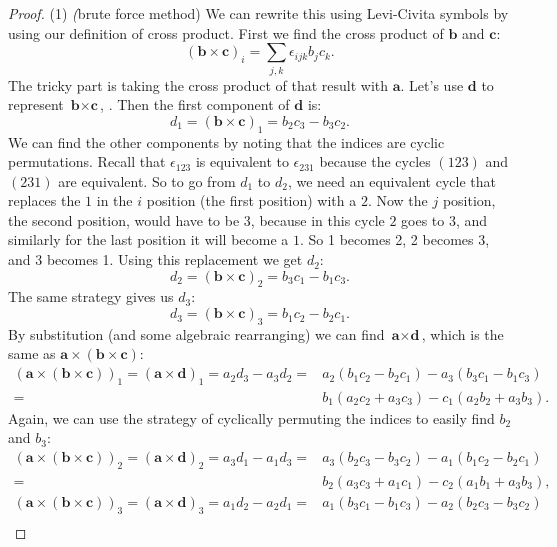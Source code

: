 \begin{proof}(1) \emph(brute force method)
We can rewrite this using Levi-Civita symbols by using our definition of cross product.  First we find the cross product of $\textbf{b}$ and $\textbf{c}$:
\[ (\textbf{b} \times \textbf{c})_i = \sum_{j,k} \epsilon_{ijk} b_j c_k. \]
The tricky part is taking the cross product of that result with $\textbf{a}$.  Let's use $\textbf{d}$ to represent $\textbf{b} \times \textbf{c}$, .  Then the first component of $\textbf{d}$ is:
\[d_1 = \left(\textbf{b} \times \textbf{c} \right)_1 = b_2 c_3 - b_3 c_2. \]
We can find the other components by noting that the indices are cyclic permutations.  Recall that $\epsilon_{123}$ is equivalent to $\epsilon_{231}$ because the cycles $(123)$ and $(231)$ are equivalent.  So to go from $d_1$ to $d_2$, we need an equivalent cycle that replaces the $1$ in the $i$ position (the first position) with a $2$.  Now the $j$ position, the second position, would have to be $3$, because in this cycle $2$ goes to $3$, and similarly for the last position it will become a $1$.  So 1 becomes 2, 2 becomes 3, and 3 becomes 1.  Using this replacement we get $d_2$:
\[d_2 = \left(\textbf{b} \times \textbf{c} \right)_2 = b_3 c_1 - b_1 c_3. \]
The same strategy gives us $d_3$:
\[d_3 = \left(\textbf{b} \times \textbf{c} \right)_3 = b_1 c_2 - b_2 c_1. \]
By substitution (and some algebraic rearranging) we can find $\textbf{a} \times \textbf{d}$, which is the same as $\textbf{a} \times \left(\textbf{b} \times \textbf{c}\right)$:
\begin{align*}
 \left(\textbf{a} \times (\textbf{b} \times \textbf{c}) \right)_1 =  \left(\textbf{a} \times \textbf{d} \right)_1 =  a_2 d_3 - a_3 d_2 =& a_2 \left(b_1 c_2 - b_2 c_1 \right) - a_3 \left(b_3 c_1 - b_1 c_3 \right) \\
=& b_1 \left(a_2 c_2 + a_3 c_3\right) - c_1 \left(a_2 b_2 + a_3 b_3 \right). 
\end{align*}
Again, we can use the strategy of cyclically permuting the indices to easily find $b_2$ and $b_3$:
\begin{align*}
 \left(\textbf{a} \times (\textbf{b} \times \textbf{c}) \right)_2 =  \left(\textbf{a} \times \textbf{d} \right)_2 =  a_3 d_1 - a_1 d_3 =& a_3 \left(b_2 c_3 - b_3 c_2 \right) - a_1 \left(b_1 c_2 - b_2 c_1 \right) \\
=& b_2 \left(a_3 c_3 + a_1 c_1\right) - c_2 \left(a_1 b_1 + a_3 b_3 \right), 
\end{align*}
\begin{align*}
 \left(\textbf{a} \times (\textbf{b} \times \textbf{c}) \right)_3 =  \left(\textbf{a} \times \textbf{d} \right)_3 =  a_1 d_2 - a_2 d_1 =& a_1 \left(b_3 c_1 - b_1 c_3 \right) - a_2 \left(b_2 c_3 - b_3 c_2 \right) \\

\end{align*}
\end{proof}

